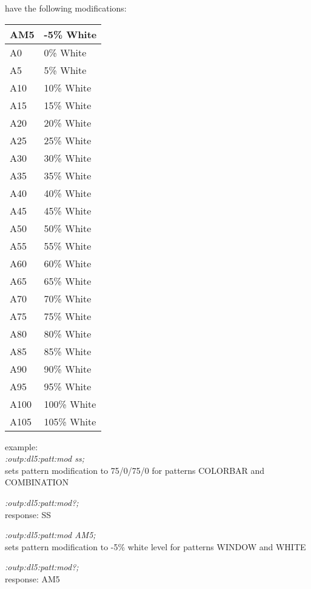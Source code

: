 have the following modifications:

\begin{tabular}{|l|l|}
\hline
AM5   &    -5\% White    \\ \hline
A0    &     0\% White    \\ \hline
A5    &     5\% White    \\ \hline
A10   &    10\% White    \\ \hline
A15   &    15\% White    \\ \hline
A20   &    20\% White    \\ \hline
A25   &    25\% White    \\ \hline
A30   &    30\% White    \\ \hline
A35   &    35\% White    \\ \hline
A40   &    40\% White     \\ \hline
A45   &    45\% White     \\ \hline
A50   &    50\% White     \\ \hline
A55   &    55\% White     \\ \hline
A60   &    60\% White     \\ \hline
A65   &    65\% White     \\ \hline
A70   &    70\% White     \\ \hline
A75   &    75\% White     \\ \hline
A80   &    80\% White     \\ \hline
A85   &    85\% White     \\ \hline
A90   &    90\% White     \\ \hline
A95   &    95\% White     \\ \hline
A100  &   100\% White    \\ \hline
A105  &   105\% White    \\ \hline
\end{tabular}

example:\\

\textit{:outp:dl5:patt:mod ss;}\\
sets pattern modification to 75/0/75/0 for patterns COLORBAR and COMBINATION

\textit{:outp:dl5:patt:mod?;}\\
response: SS

\textit{:outp:dl5:patt:mod AM5;}\\
sets pattern modification to -5\% white level for patterns WINDOW and WHITE

\textit{:outp:dl5:patt:mod?;}\\
response: AM5


